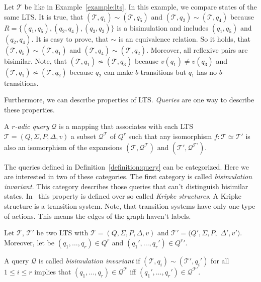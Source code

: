 \begin{example}
    \label{example:bisimilar}
    Let $\mathcal{T}$ be like in Example~\ref{example:lts}. In this example, we compare states of the same LTS. It is
    true, that $(\mathcal{T}, q_1) \sim (\mathcal{T}, q_5)$ and $(\mathcal{T}, q_2) \sim (\mathcal{T}, q_4)$ because
    $R = \{(q_1, q_5), (q_2, q_4), (q_3, q_3)\}$ is a bisimulation and includes $(q_1, q_5)$ and $(q_2, q_4)$. It is
    easy to prove, that $\sim$ is an equivalence relation. So it holds, that $(\mathcal{T}, q_5) \sim (\mathcal{T},
    q_1)$ and $(\mathcal{T}, q_4) \sim (\mathcal{T}, q_2)$. Moreover, all reflexive pairs are bisimilar. Note, that
    $(\mathcal{T}, q_1) \not\sim (\mathcal{T}, q_3)$ because $v(q_1) \neq v(q_3)$ and $(\mathcal{T}, q_1)
    \not\sim (\mathcal{T}, q_2)$ because $q_2$ can make $b$-transitions but $q_1$ has no $b$-transitions.
\end{example}

Furthermore, we can describe properties of LTS. \textit{Queries} are one way to describe these properties.

\begin{definition}{\cite{otto1999bisimulation}}
    \label{definition:query}
    A \emph{$r$-adic query} $\mathcal{Q}$ is a mapping that associates with each LTS $\mathcal{T} = (Q, \Sigma, P,
    \Delta, v)$ a subset $\mathcal{Q}^{\mathcal{T}}$ of $Q^r$ such that any isomorphism $f:
    \mathcal{T} \simeq \mathcal{T}'$ is also an isomorphism of the expansions $(\mathcal{T}, \mathcal{Q}^{\mathcal{T}})$
    and $({\mathcal{T}}', \mathcal{Q}^{{\mathcal{T}}'})$.
\end{definition}

The queries defined in Definition~\ref{definition:query} can be categorized. Here we are interested in two of these
categories. The first category is called \textit{bisimulation invariant}. This category describes those queries that
can't distinguish bisimilar states. In~\cite{otto1999bisimulation} this property is defined over so called
\textit{Kripke structures}. A Kripke structure
is a transition system. Note, that transition systems  have only one type of actions. This means the edges of the
graph haven't labels.

\begin{definition}
    \label{definition:bisimulationInvariant}
    Let $\mathcal{T}$, $\mathcal{T}'$ be two LTS with $\mathcal{T} = (Q, \Sigma, P, \Delta, v)$
    and $\mathcal{T}' = (Q', \Sigma, P,$ $ \Delta', v')$. Moreover, let be $(q_1, \dots, q_r) \in Q^r$ and $({q_1}',
    \dots, {q_r}') \in {Q^r}'$.

    A query $\mathcal{Q}$ is called \emph{bisimulation invariant} if $(\mathcal{T}, q_i) \sim (\mathcal{T}', q_i')$
    for all $1 \leq i \leq r$ implies that $(q_1, \dots, q_r) \in \mathcal{Q}^\mathcal{T}$ iff $({q_1}',
    \dots, {q_r}') \in \mathcal{Q}^{{\mathcal{T}}'}$.
\end{definition}

